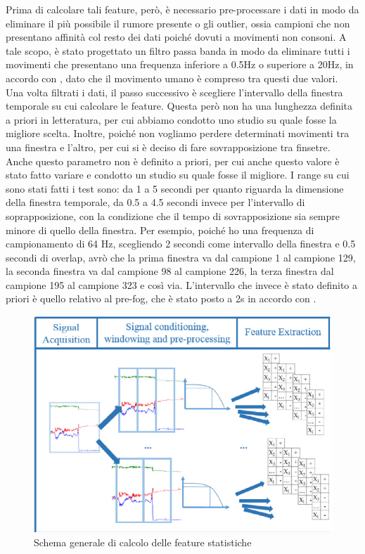 Prima di calcolare tali feature, però, è necessario pre-processare i dati in modo da eliminare il più possibile il rumore presente o gli outlier, ossia campioni che non presentano affinità col resto dei dati poiché dovuti a movimenti non consoni. A tale scopo, è stato progettato un filtro passa banda in modo da eliminare tutti i movimenti che presentano una frequenza inferiore a 0.5Hz o superiore a 20Hz, in accordo con \cite{21}, dato che il movimento umano è compreso tra questi due valori.\\
Una volta filtrati i dati, il passo successivo è scegliere l'intervallo della finestra temporale su cui calcolare le feature. Questa però non ha una lunghezza definita a priori in letteratura, per cui abbiamo condotto uno studio su quale fosse la migliore scelta. Inoltre, poiché non vogliamo perdere determinati movimenti tra una finestra e l'altro, per cui si è deciso di fare sovrapposizione tra finsetre. Anche questo parametro non è definito a priori, per cui anche questo valore è stato fatto variare e condotto un studio su quale fosse il migliore. I range su cui sono stati fatti i test sono: da 1 a 5 secondi per quanto riguarda la dimensione della finestra temporale, da 0.5 a 4.5 secondi invece per l'intervallo di soprapposizione, con la condizione che il tempo di sovrapposizione sia sempre minore di quello della finestra. Per esempio, poiché ho una frequenza di campionamento di 64 Hz, scegliendo 2 secondi come intervallo della finestra e 0.5 secondi di overlap, avrò che la prima finestra va dal campione 1 al campione 129, la seconda finestra va dal campione 98 al campione 226, la terza finestra dal campione 195 al campione 323 e così via. L'intervallo che invece è stato definito a priori è quello relativo al pre-fog, che è stato posto a 2s in accordo con \cite{12}.
\begin{figure}[h!]
	\centering
	\includegraphics[scale=0.6]{images/flusso_feature.png}
	\caption{Schema generale di calcolo delle feature statistiche}
	\label{Flusso Feature}
\end{figure}

